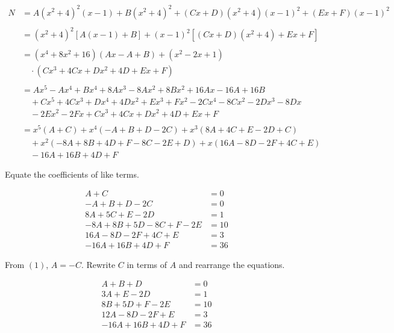 \documentclass{article}
\begin{document}
\begin{align*}
N&=A\left(x^2+4\right)^2(x-1)+B\left(x^2+4\right)^2+(Cx+D)\left(x^2+4\right)(x-1)^2+(Ex+F)(x-1)^2\\\\&=\left(x^2+4\right)^2\left[A(x-1)+B\right]+(x-1)^2\left[(Cx+D)\left(x^2+4\right)+Ex+F\right]\\\\&=\left(x^4+8x^2+16\right)(Ax-A+B)+\left(x^2-2x+1\right)\\&\hspace{1em}\cdot\left(Cx^3+4Cx+Dx^2+4D+Ex+F\right)\\\\&=Ax^5-Ax^4+Bx^4+8Ax^3-8Ax^2+8Bx^2+16Ax-16A+16B\\&\hspace{1em}+Cx^5+4Cx^3+Dx^4+4Dx^2+Ex^3+Fx^2-2Cx^4-8Cx^2-2Dx^3-8Dx\\&\hspace{1em}-2Ex^2-2Fx+Cx^3+4Cx+Dx^2+4D+Ex+F\\\\&=x^5\left(A+C\right)+x^4\left(-A+B+D-2C\right)+x^3\left(8A+4C+E-2D+C\right)\\&\hspace{1em}+x^2\left(-8A+8B+4D+F-8C-2E+D\right)+x\left(16A-8D-2F+4C+E\right)\\&\hspace{1em}-16A+16B+4D+F
\end{align*}

\hfill

\noindent Equate the coefficients of like terms.

\begin{align}
A+C&=0\\
-A+B+D-2C&=0\nonumber\\
8A+5C+E-2D&=1\nonumber\\
-8A+8B+5D-8C+F-2E&=10\nonumber\\
16A-8D-2F+4C+E&=3\nonumber\\
-16A+16B+4D+F&=36\nonumber
\end{align}

\noindent From $(1)$, $A=-C$. Rewrite $C$ in terms of $A$ and rearrange the equations.

\begin{align}
A+B+D&=0\\
3A+E-2D&=1\nonumber\\
8B+5D+F-2E&=10\nonumber\\
12A-8D-2F+E&=3\nonumber\\
-16A+16B+4D+F&=36\nonumber
\end{align}
\end{document}
